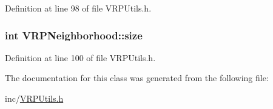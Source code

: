 Definition at line 98 of file VRPUtils.h.

\hypertarget{class_v_r_p_neighborhood_a7af09c3f61275806b356f0833dafa00f}{
\subsubsection[{size}]{\setlength{\rightskip}{0pt plus 5cm}int {\bf VRPNeighborhood::size}}}
\label{class_v_r_p_neighborhood_a7af09c3f61275806b356f0833dafa00f}


Definition at line 100 of file VRPUtils.h.



The documentation for this class was generated from the following file:\begin{DoxyCompactItemize}
\item 
inc/\hyperlink{_v_r_p_utils_8h}{VRPUtils.h}\end{DoxyCompactItemize}
